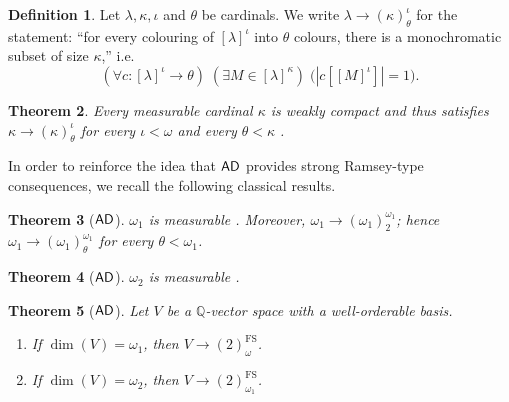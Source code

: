 \documentclass{amsart}
\newtheorem{theorem}{Theorem}[section]
\theoremstyle{definition}
\newtheorem{definition}[theorem]{Definition}
\newcommand{\ad}{\mathnormal{\mathsf{AD}}}
\theoremstyle{remark}
\numberwithin{equation}{section}
\begin{document}
\begin{definition}\label{def:partition-relation}
Let $\lambda,\kappa,\iota$ and $\theta$ be cardinals. We write $\lambda\to(\kappa)^{\iota}_{\theta}$ for the statement:
``for every colouring of $[\lambda]^{\iota}$ into $\theta$ colours, there is a monochromatic subset of size $\kappa$,'' i.e.
\[
(\forall c:[\lambda]^{\iota}\to\theta)\;
(\exists M\in[\lambda]^{\kappa})\;
\bigl(|c[[M]^{\iota}]|=1\bigr).
\]
\end{definition}

\begin{theorem}\label{thm:measurable-partition}
Every measurable cardinal $\kappa$ is weakly compact \cite[Lemma 10.18]{Jech2003} and thus satisfies $\kappa\to(\kappa)^{\iota}_{\theta}$ for every $\iota<\omega$ and every $\theta<\kappa$ \cite[Theorem 7.8]{Kanamori2003}.
\end{theorem}

In order to reinforce the idea that $\ad$ provides strong Ramsey-type consequences, we recall the following classical results.

\begin{theorem}[$\ad$]\label{thm:martin-omega1}
    $\omega_1$ is measurable \cite[Theorem 28.2 by D. Martin]{Kanamori2003}. Moreover, $\omega_1\to(\omega_1)^{\omega_1}_{2}$; hence $\omega_1\to(\omega_1)^{\omega_1}_{\theta}$ for every $\theta<\omega_1$.
\end{theorem}

\begin{theorem}[$\ad$]\label{thm:solovay-omega2}
    $\omega_2$ is measurable \cite[Theorem 28.6 by R. Solovay]{Kanamori2003}.
\end{theorem}

\begin{theorem}[$\ad$]\label{thm:hindman-omega1-positive}
Let $V$ be a $\mathbb{Q}$-vector space with a well-orderable basis.
\begin{enumerate}
    \item If $\operatorname{dim}(V)=\omega_1$, then $V\to(2)^{\operatorname{FS}}_{\omega}$.
    \item If $\operatorname{dim}(V)=\omega_2$, then $V\to(2)^{\operatorname{FS}}_{\omega_1}$.
\end{enumerate}
\end{theorem}
\end{document}
